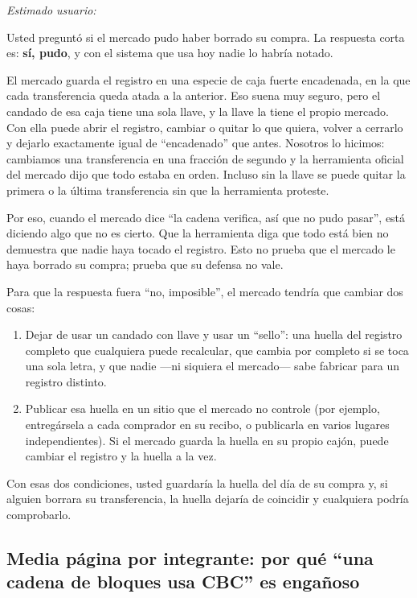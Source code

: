 \documentclass[11pt,letterpaper]{article}
\begin{document}
\emph{Estimado usuario:}

Usted preguntó si el mercado pudo haber borrado su compra. La respuesta corta es: \textbf{sí, pudo}, y
con el sistema que usa hoy nadie lo habría notado.

El mercado guarda el registro en una especie de caja fuerte encadenada, en la que cada transferencia queda
atada a la anterior. Eso suena muy seguro, pero el candado de esa caja tiene una sola llave, y la llave la tiene el
propio mercado. Con ella puede abrir el registro, cambiar o quitar lo que quiera, volver a cerrarlo y dejarlo
exactamente igual de ``encadenado'' que antes. Nosotros lo hicimos: cambiamos una transferencia en una fracción de
segundo y la herramienta oficial del mercado dijo que todo estaba en orden. Incluso sin la llave se puede quitar la
primera o la última transferencia sin que la herramienta proteste.

Por eso, cuando el mercado dice ``la cadena verifica, así que no pudo pasar'', está diciendo algo que no es cierto. Que
la herramienta diga que todo está bien no demuestra que nadie haya tocado el registro. Esto no prueba que el mercado
le haya borrado su compra; prueba que su defensa no vale.

Para que la respuesta fuera ``no, imposible'', el mercado tendría que cambiar dos cosas:
\begin{enumerate}[itemsep=1pt]
  \item Dejar de usar un candado con llave y usar un ``sello'': una huella del registro completo que cualquiera puede
        recalcular, que cambia por completo si se toca una sola letra, y que nadie ---ni siquiera el mercado--- sabe
        fabricar para un registro distinto.
  \item Publicar esa huella en un sitio que el mercado no controle (por ejemplo, entregársela a cada comprador en su
        recibo, o publicarla en varios lugares independientes). Si el mercado guarda la huella en su propio cajón, puede
        cambiar el registro y la huella a la vez.
\end{enumerate}
Con esas dos condiciones, usted guardaría la huella del día de su compra y, si alguien borrara su transferencia, la
huella dejaría de coincidir y cualquiera podría comprobarlo.

\subsection{Media página por integrante: por qué ``una cadena de bloques usa CBC'' es engañoso}
\end{document}
